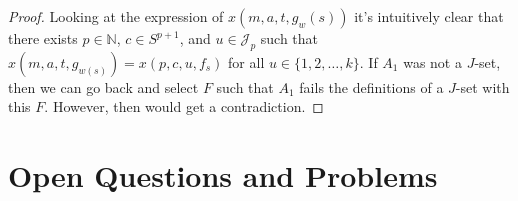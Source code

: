 \documentclass[12pt]{article}
\theoremstyle{plain}
\theoremstyle{definition}
\newcommand{\bbN}{\mathbb{N}}
\newcommand{\calJ}{\mathcal{J}}
\begin{document}
\begin{proof}
  Looking at the expression of $x(m, a, t, g_w(s))$ it's intuitively
  clear that there exists $p \in \bbN$, $c \in S^{p+1}$, and $u \in
  \calJ_p$ such that $x(m, a, t, g_{w(s)}) = x(p, c, u, f_s)$ for all
  $u \in \{1, 2, \ldots, k\}$. 
  If $A_1$ was not a $J$-set, then  we can go back and select $F$ such
  that $A_1$ fails the definitions of a $J$-set with this $F$. 
  However, then would get a contradiction. 
\end{proof}

\section{Open Questions and Problems}




\end{document}

